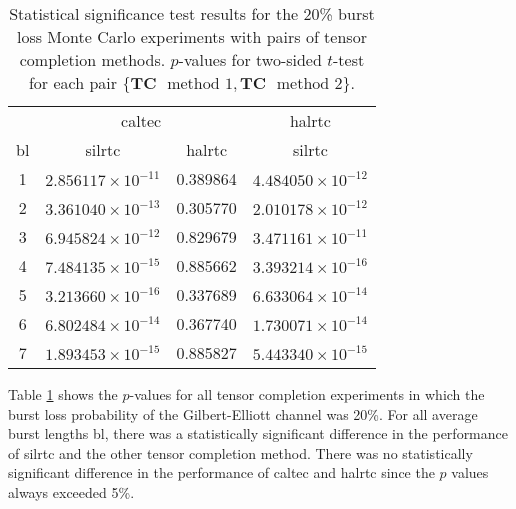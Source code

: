 \begin{table}[H]
	\caption[Statistical significance results for the 20\% burst loss scenario with no tensor completion]{Statistical significance test results for the 20\% burst loss Monte Carlo experiments with pairs of tensor completion methods. $p$-values for two-sided $t$-test for each pair $\{\textbf{TC} \mbox{ } \text{method 1},\textbf{TC} \mbox{ } \text{method 2}\}$.} \label{table:expts:ttest:tc:0.2}
	\centering
	\begin{adjustbox}{max width = \textwidth}
		\begin{tabular}{|c|cc|c|}
			\hline
			\multicolumn{1}{|c|}{} &
			\multicolumn{2}{c|}{\gls{caltec}} & \multicolumn{1}{c|}{\gls{halrtc}} \\
			\gls{bl} &  \gls{silrtc} &  \gls{halrtc} &  \gls{silrtc} \\
			\hline \hline 
			1 &   $2.856117 \times 10^{-11}$ &      \cellcolor{red!40} 0.389864 &   $4.484050 \times 10^{-12}$ \\
			2 &   $3.361040 \times 10^{-13}$ &   \cellcolor{red!40}    0.305770 &   $2.010178 \times 10^{-12}$ \\
			3 &   $6.945824 \times 10^{-12}$ &  \cellcolor{red!40}      0.829679 &   $3.471161 \times 10^{-11}$ \\
			4 &   $7.484135 \times 10^{-15}$ &  \cellcolor{red!40}     0.885662 &   $3.393214 \times 10^{-16}$ \\
			5 &   $3.213660 \times 10^{-16}$ &    \cellcolor{red!40}   0.337689 &   $6.633064 \times 10^{-14}$ \\
			6 &   $6.802484 \times 10^{-14}$ &  \cellcolor{red!40}     0.367740 &   $1.730071 \times 10^{-14}$ \\
			7 &   $1.893453 \times 10^{-15}$ &    \cellcolor{red!40}   0.885827 &   $5.443340 \times 10^{-15}$ \\
				\hline
		\end{tabular}%
	\end{adjustbox}
\end{table}

Table \ref{table:expts:ttest:tc:0.2} shows the $p$-values for all tensor completion experiments in which the burst loss probability of the Gilbert-Elliott channel was 20\%. For all average burst lengths \gls{bl}, there was a statistically significant difference in the performance of \gls{silrtc} and the other tensor completion method. There was no statistically significant difference in the performance of \gls{caltec} and \gls{halrtc} since the $p$ values always exceeded 5\%.

